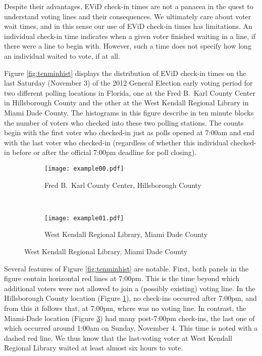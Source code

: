 \documentclass[12pt,titlepage]{article}
\begin{document}
Despite their advantages, EViD check-in times are not a panacea in the
quest to understand voting lines and their consequences.  We
ultimately care about voter wait times, and in this sense our use of
EViD check-in times has limitations.  An individual check-in time
indicates when a given voter finished waiting in a line, if there were
a line to begin with.  However, such a time does not specify how long
an individual waited to vote, if at all.  


Figure \ref{fig:tenminhist} displays the distribution of EViD check-in
times on the last Saturday (November 3) of the 2012 General Election
early voting period for two different polling locations in Florida,
one at the Fred B.\ Karl County Center in Hillsborough County and the
other at the West Kendall Regional Library in Miami Dade County.  The
histograms in this figure describe in ten minute blocks the number of
voters who checked into these two polling stations.  The counts begin
with the first voter who checked-in just as polls opened at 7:00am and
end with the last voter who checked-in (regardless of whether this
individual checked-in before or after the official 7:00pm deadline for
poll closing).

\begin{figure}[!ht]
  \caption{Early voting check-in times on Saturday, November 3, 2012, in two Florida locations}
  \label{fig:tenminhist}
  \centering
  \begin{subfigure}[b]{\linewidth}
    \centering\texttt{[image: example00.pdf]}
    \caption{Fred B.\ Karl County Center, Hillsborough County}
    \label{fig:karlexample}
  \end{subfigure}%
  \\
  \begin{subfigure}[b]{\linewidth}
    \centering\texttt{[image: example01.pdf]}
    \caption{West Kendall Regional Library, Miami Dade County}
    \label{fig:kendallexample}
  \end{subfigure}
\end{figure}

Several features of Figure \ref{fig:tenminhist} are notable.  First,
both panels in the figure contain horizontal red lines at 7:00pm.
This is the time beyond which additional voters were not allowed to
join a (possibly existing) voting line.  In the Hillsborough County
location (Figure \ref{fig:karlexample}), no check-ins occurred after
7:00pm, and from this it follows that, at 7:00pm, where was no voting
line.  In contrast, the Miami-Dade location (Figure
\ref{fig:kendallexample}) had many post-7:00pm check-ins, the last one
of which occurred around 1:00am on Sunday, November 4.  This time is
noted with a dashed red line.  We thus know that the last-voting voter
at West Kendall Regional Library waited at least almost six hours to
vote.
\end{document}
